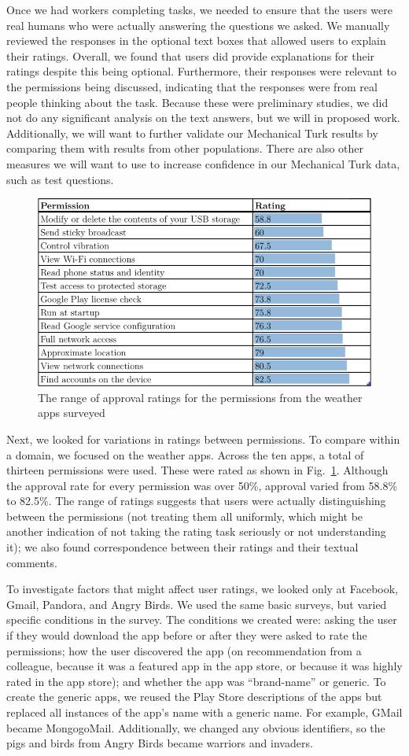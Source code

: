 \documentclass[11pt]{article}
\begin{document}
Once we had workers completing tasks, we needed to ensure that the
users were real humans who were actually answering the questions we
asked. We manually reviewed the responses in the optional text boxes
that allowed users to explain their ratings. Overall, we found that
users did provide explanations for their ratings despite this being
optional. Furthermore, their responses were relevant to the
permissions being discussed, indicating that the responses were from
real people thinking about the task. Because these were preliminary
studies, we did not do any significant analysis on the text answers,
but we will in proposed work. Additionally, we will want to further
validate our Mechanical Turk results by comparing them with results
from other populations. There are also other measures we will want to
use to increase confidence in our Mechanical Turk data, such as test
questions.

\begin{figure}[t]
\centering
    \includegraphics[width=.6\linewidth]{img/RatingTable.png}
    \vspace{1pt}
    \caption{The range of approval ratings for the permissions from the 
    weather apps surveyed}
    \label{weatherratings}
\end{figure}

Next, we looked for variations in ratings between permissions. To
compare within a domain, we focused on the weather apps. Across the
ten apps, a total of thirteen permissions were used. These were rated
as shown in Fig.~\ref{weatherratings}.  Although the approval rate for
every permission was over 50\%, approval varied from 58.8\% to
82.5\%. The range of ratings suggests that users were actually
distinguishing between the permissions (not treating them all
uniformly, which might be another indication of not taking the rating
task seriously or not understanding it); we also found correspondence
between their ratings and their textual comments.

To investigate factors that might affect user ratings, we looked only at Facebook, Gmail,
Pandora, and Angry Birds.  We used the same basic surveys, but
varied specific conditions in the survey. The conditions we created
were: asking the user if they would download the app before or after
they were asked to rate the permissions; how the user discovered the
app (on recommendation from a colleague, because it was a featured app in
the app store, or because it was highly rated in the app store); and
whether the app was ``brand-name'' or generic. To create the generic
apps, we reused the Play Store descriptions of the apps but replaced all
instances of the app's name with a generic name. For example, GMail
became MongogoMail.  Additionally, we changed any obvious identifiers,
so the pigs and birds from Angry Birds became warriors and invaders.
\end{document}
